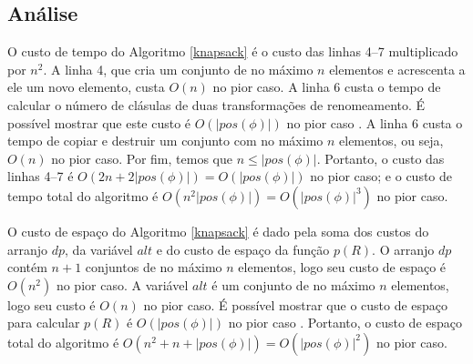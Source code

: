 \subsection{Análise}

\indent

O custo de tempo do Algoritmo \ref{knapsack} é o custo das linhas 4--7 multiplicado por $n^2$. A linha 4, que cria um conjunto de no máximo $n$ elementos e acrescenta a ele um novo elemento, custa $O(n)$ no pior caso. A linha 6 custa o tempo de calcular o número de clásulas de duas transformações de renomeamento. É possível mostrar que este custo é $O(|pos(\phi)|)$ no pior caso \cite{nonnengart2001computing}. A linha 6 custa o tempo de copiar e destruir um conjunto com no máximo $n$ elementos, ou seja, $O(n)$ no pior caso. Por fim, temos que $n \leq |pos(\phi)|$. Portanto, o custo das linhas 4--7 é $O(2n + 2|pos(\phi)|) = O(|pos(\phi)|)$ no pior caso; e o custo de tempo total do algoritmo é $O(n^2 |pos(\phi)|) = O(|pos(\phi)|^3)$ no pior caso.

O custo de espaço do Algoritmo \ref{knapsack} é dado pela soma dos custos do arranjo $dp$, da variável $alt$ e do custo de espaço da função $p(R)$. O arranjo $dp$ contém $n+1$ conjuntos de no máximo $n$ elementos, logo seu custo de espaço é $O(n^2)$ no pior caso. A variável $alt$ é um conjunto de no máximo $n$ elementos, logo seu custo é $O(n)$ no pior caso. É possível mostrar que o custo de espaço para calcular $p(R)$ é $O(|pos(\phi)|)$ no pior caso \cite{nonnengart2001computing}. Portanto, o custo de espaço total do algoritmo é $O(n^2 + n + |pos(\phi)|) = O(|pos(\phi)|^2)$ no pior caso.
